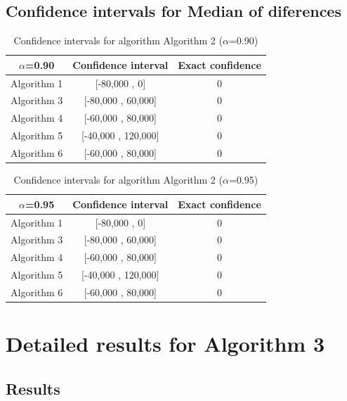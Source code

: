 \documentclass[a4paper,10pt]{article}
\begin{document}
\subsection{Confidence intervals for Median of diferences}

\begin{table}[!htp]
\centering\small
\begin{tabular}{
|c|c|c|}
\hline
 $\alpha$=0.90 & Confidence interval & Exact confidence \\ \hline 
Algorithm 1 & [-80,000 , 0] & 0\\ \hline 
Algorithm 3 & [-80,000 , 60,000] & 0\\ \hline 
Algorithm 4 & [-60,000 , 80,000] & 0\\ \hline 
Algorithm 5 & [-40,000 , 120,000] & 0\\ \hline 
Algorithm 6 & [-60,000 , 80,000] & 0\\ \hline 

\end{tabular}
\caption{Confidence intervals for algorithm Algorithm 2 ($\alpha$=0.90)}
\end{table}
\begin{table}[!htp]
\centering\small
\begin{tabular}{
|c|c|c|}
\hline
 $\alpha$=0.95 & Confidence interval & Exact confidence \\ \hline 
Algorithm 1 & [-80,000 , 0] & 0\\ \hline 
Algorithm 3 & [-80,000 , 60,000] & 0\\ \hline 
Algorithm 4 & [-60,000 , 80,000] & 0\\ \hline 
Algorithm 5 & [-40,000 , 120,000] & 0\\ \hline 
Algorithm 6 & [-60,000 , 80,000] & 0\\ \hline 

\end{tabular}
\caption{Confidence intervals for algorithm Algorithm 2 ($\alpha$=0.95)}
\end{table}

 \clearpage 


\section{Detailed results for Algorithm 3}


\subsection{Results}
\end{document}
